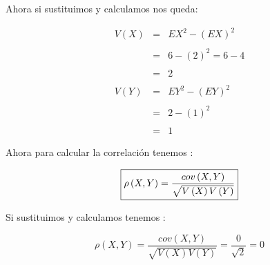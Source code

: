 \documentclass[12pt]{article}
\begin{document}
    \begin{flushleft}
        Ahora si sustituimos y calculamos nos queda: 
    \end{flushleft}
    \begin{equation*}
        \begin{array}{rcl}
            V\left(X\right) & = & EX^2 - \left(EX\right)^2
            \\ 
            \\
                            & = & 6 - \left(2\right)^2 = 6-4 
            \\
            \\
                            & = & 2
            \\
            \\
            V\left(Y\right) & = & EY^2  - \left(EY\right)^2
            \\
            \\
                            & = & 2 - \left(1\right)^2
            \\
            \\
                            & = & 1
        \end{array}
    \end{equation*}
    

    \begin{flushleft}
        Ahora para calcular la correlaci\'on tenemos : 
    \end{flushleft}

    \begin{equation*}
        \fbox{$
            \rho \left(X,Y\right) = \displaystyle \frac{cov \left(X,Y\right)}{\sqrt{V\left(X\right)V\left(Y\right)}}
        $}    
    \end{equation*}

    \begin{flushleft}
        Si sustituimos y calculamos tenemos : 
    \end{flushleft}

    \begin{equation*}
        \rho \left(X,Y\right) = \displaystyle \frac{cov \left(X,Y\right)}{\sqrt{V\left(X\right)V\left(Y\right)}} = \frac{0}{\sqrt{2}} = 0 
    \end{equation*}
\end{document}

